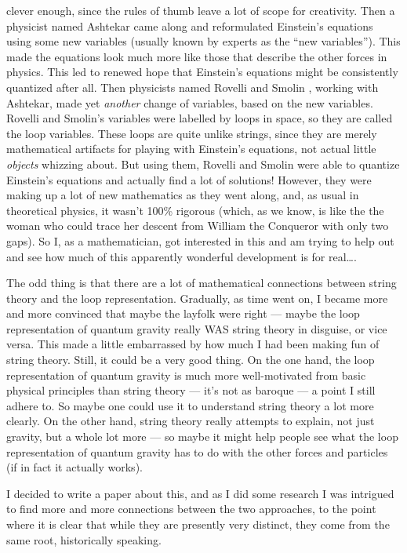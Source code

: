 \documentclass{article}
\begin{document}
clever enough, since the rules of thumb leave a lot of scope for
creativity. Then a physicist named Ashtekar came along and reformulated
Einstein's equations using some new variables (usually known by experts
as the ``new variables''). This made the equations look much more like
those that describe the other forces in physics. This led to renewed
hope that Einstein's equations might be consistently quantized after
all. Then physicists named Rovelli and Smolin , working with Ashtekar,
made yet \emph{another} change of variables, based on the new variables.
Rovelli and Smolin's variables were labelled by loops in space, so they
are called the loop variables. These loops are quite unlike strings,
since they are merely mathematical artifacts for playing with Einstein's
equations, not actual little \emph{objects} whizzing about. But using
them, Rovelli and Smolin were able to quantize Einstein's equations and
actually find a lot of solutions! However, they were making up a lot of
new mathematics as they went along, and, as usual in theoretical
physics, it wasn't 100\% rigorous (which, as we know, is like the the
woman who could trace her descent from William the Conqueror with only
two gaps). So I, as a mathematician, got interested in this and am
trying to help out and see how much of this apparently wonderful
development is for real\ldots.

The odd thing is that there are a lot of mathematical connections
between string theory and the loop representation. Gradually, as time
went on, I became more and more convinced that maybe the layfolk were
right --- maybe the loop representation of quantum gravity really WAS
string theory in disguise, or vice versa. This made a little embarrassed
by how much I had been making fun of string theory. Still, it could be a
very good thing. On the one hand, the loop representation of quantum
gravity is much more well-motivated from basic physical principles than
string theory --- it's not as baroque --- a point I still adhere to. So
maybe one could use it to understand string theory a lot more clearly.
On the other hand, string theory really attempts to explain, not just
gravity, but a whole lot more --- so maybe it might help people see what
the loop representation of quantum gravity has to do with the other
forces and particles (if in fact it actually works).

I decided to write a paper about this, and as I did some research I was
intrigued to find more and more connections between the two approaches,
to the point where it is clear that while they are presently very
distinct, they come from the same root, historically speaking.
\end{document}
